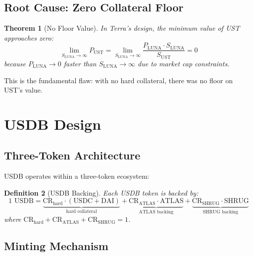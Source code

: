 \documentclass[11pt,a4paper]{article}
\newtheorem{theorem}{Theorem}[section]
\newtheorem{definition}[theorem]{Definition}
\begin{document}
\subsection{Root Cause: Zero Collateral Floor}

\begin{theorem}[No Floor Value]
In Terra's design, the minimum value of UST approaches zero:
\begin{equation}
\lim_{S_{\text{LUNA}} \to \infty} P_{\text{UST}} = \lim_{S_{\text{LUNA}} \to \infty} \frac{P_{\text{LUNA}} \cdot S_{\text{LUNA}}}{S_{\text{UST}}} = 0
\end{equation}
because $P_{\text{LUNA}} \to 0$ faster than $S_{\text{LUNA}} \to \infty$ due to market cap constraints.
\end{theorem}

This is the fundamental flaw: with no hard collateral, there was no floor on UST's value.

\section{USDB Design}
\label{sec:usdbdesign}

\subsection{Three-Token Architecture}

USDB operates within a three-token ecosystem:

\begin{definition}[USDB Backing]
Each USDB token is backed by:
\begin{equation}
1 \text{ USDB} = \underbrace{\text{CR}_{\text{hard}} \cdot (\text{USDC} + \text{DAI})}_{\text{hard collateral}} + \underbrace{\text{CR}_{\text{ATLAS}} \cdot \text{ATLAS}}_{\text{ATLAS backing}} + \underbrace{\text{CR}_{\text{SHRUG}} \cdot \text{SHRUG}}_{\text{SHRUG backing}}
\end{equation}
where $\text{CR}_{\text{hard}} + \text{CR}_{\text{ATLAS}} + \text{CR}_{\text{SHRUG}} = 1$.
\end{definition}

\subsection{Minting Mechanism}
\end{document}
